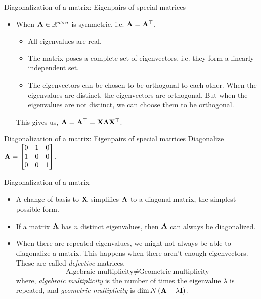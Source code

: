 \documentclass[aspectratio=169]{beamer}
\let\olditem\item
\renewcommand{\item}{\setlength{\itemsep}{\fill}\olditem}
\def\mf{\ensuremath\mathbf}
\def\mb{\ensuremath\mathbb}
\def\lp{\ensuremath\left(}
\def\rp{\ensuremath\right)}
\def\bmx{\ensuremath\begin{bmatrix*}[r]}
\def\emx{\ensuremath\end{bmatrix*}}
\begin{document}
\begin{frame}[t]{Diagonalization of a matrix: Eigenpairs of special matrices}
\begin{itemize}
    \item When $\mf{A} \in \mb{R}^{n \times n}$ is symmetric, i.e. $\mf{A} = \mf{A}^\top$,
    \begin{itemize}
        \item All eigenvalues are real.
        \item The matrix poses a complete set of eigenvectors, i.e. they form a linearly independent set.
        \item The eigenvectors can be chosen to be orthogonal to each other. When the eigenvalues are distinct, the eigenvectors are orthogonal. But when the eigenvalues are not distinct, we can choose them to be orthogonal.
    \end{itemize}
    This gives us, $\mf{A} = \mf{A}^\top = \mf{X}\mf{\Lambda}\mf{X}^\top$.
\end{itemize}
\end{frame}


\begin{frame}[t]{Diagonalization of a matrix: Eigenpairs of special matrices}
    Diagonalize $\mf{A} = \bmx 0 & 1 & 0\\1 & 0 & 0\\0 & 0 & 1\emx$.
\end{frame}


\begin{frame}[t]{Diagonalization of a matrix}
\begin{itemize}
    \item A change of basis to $\mf{X}$ simplifies $\mf{A}$ to a diagonal matrix, the simplest possible form.

    \item If a matrix $\mf{A}$ has $n$ distinct eigenvalues, then $\mf{A}$ can always be diagonalized.

    \item When there are repeated eigenvalues, we might not always be able to diagonalize a matrix. This happens when there aren't enough eigenvectors. These are called \textit{defective} matrices.
    \[ \text{Algebraic multiplicity} \neq \text{Geometric multiplicity} \]
    where, \textit{algebraic multiplicity} is the number of times the eigenvalue $\lambda$ is repeated, and \textit{geometric multiplicity} is $\dim N\lp \mf{A} - \lambda\mf{I}\rp$.
\end{itemize}
\end{frame}
\end{document}
